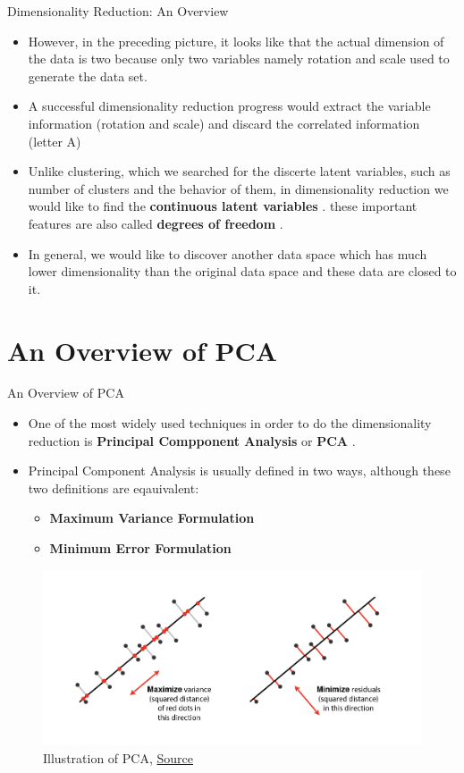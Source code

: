 \documentclass[compress,oilve]{beamer}
\newcommand{\tc}[2]{
 \textcolor{#1}{\textbf{#2}}
}
\begin{document}
\begin{frame}{Dimensionality Reduction: An Overview}
\begin{itemize}
\item However, in the preceding picture, it looks like that the actual dimension of the data is two because only two variables namely rotation and scale used to generate the data set.
\medskip
\item A successful dimensionality reduction progress would extract the variable information (rotation and scale) and discard the correlated information (letter A)
\medskip
\item Unlike clustering, which we searched for the discerte latent variables, such as number of clusters and the behavior of them, in dimensionality reduction we would like to find the \tc{keywords}{continuous latent variables}. these important features are also called \tc{keywords}{degrees of freedom}.
\medskip
\item In general, we would like to discover another data space which has much lower dimensionality than the original data space and these data are closed to it.
\end{itemize}
\end{frame}


\section{An Overview of PCA}
\begin{frame}{An Overview of PCA}
\begin{itemize}
\item One of the most widely used techniques in order to do the dimensionality reduction is \tc{keywords}{Principal Compponent Analysis} or \tc{keywords}{PCA}.
\item Principal Component Analysis is usually defined in two ways, although these two definitions are eqauivalent:
\begin{itemize}
\item \tc{keywords}{Maximum Variance Formulation}
\item \tc{keywords}{Minimum Error Formulation}
\end{itemize}
\end{itemize}
\begin{figure}
		\includegraphics[scale=0.5]{1}
		\caption{Illustration of PCA, \href{	https://tinyurl.com/2q6ec2c6}{Source}}
	\end{figure}
\end{frame}
\end{document}
